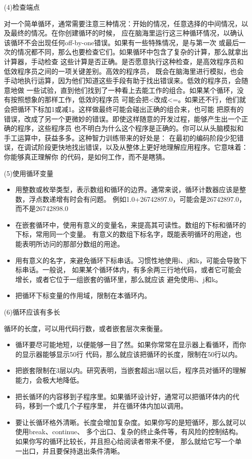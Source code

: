 \documentclass{article}
\begin{document}
\par
(4)检查端点
\par
对一个简单循环，通常需要注意三种情况：开始的情况，任意选择的中间情况，以及最终的情况。在你创建循环的时候，
应在脑海里运行这三种循环情况，以确认该循环不会出现任何off-by-one错误。如果有一些特殊情况，是与第一次
或最后一次的情况都不同，那么也要检查它们。如果循环中包含了复杂的计算，那么就拿出计算器，手动检查
这些计算是否正确。是否愿意执行这种检查，是高效程序员和低效程序员之间的一项关键差别。高效的程序员，
既会在脑海里进行模拟，也会手动地执行运算，因为他们知道这些手段有助于找出错误来。低效的程序员，会随意地做
一些试验，直到他们找到了一种看上去能工作的组合。如果某个循环，没有按照想象的那样工作，低效的程序员
可能会把<改成<=。如果还不行，他们就会把循环下标加1或减1。这样做最终可能会碰出正确的组合来，也可能
把原有的错误，改成了另一个更微妙的错误。即使这样随意的开发过程，能够产生出一个正确的程序，这些程序员
也不明白为什么这个程序是正确的。你可以从头脑模拟和手工运算中，获益多多。这种智力训练带来的好处是：
在最初的编码阶段少犯错误，在调试阶段更快地找出错误，以及从整体上更好地理解应用程序。它意味着：你能够真正理解你
的代码，是如何工作，而不是瞎猜。

\par
(5)使用循环变量
\par
\begin{itemize}
    \item 用整数或枚举类型，表示数组和循环的边界。通常来说，循环计数器应该是整数，浮点数递增有时会有问题。
    例如1.0+26742897.0，可能会是26742897.0，而不是26742898.0
    \item 在嵌套循环中，使用有意义的变量名，来提高其可读性。数组的下标和循环的下标，常用同一个变量。
    有意义的数组下标名字，既能表明循环的用途，也能表明所访问的那部分数组的用途。
    \item 用有意义的名字，来避免循环下标串话。习惯性地使用i、j和k，可能会导致下标串话。一般说，
    如果某个循环体内，有多余两三行地代码，或者它可能会增长，或者它位于一组嵌套的循环里，那么就应该
    避免使用i、j和k。
    \item 把循环下标变量的作用域，限制在本循环内。
\end{itemize}

\par
(6)循环应该有多长
\par
循环的长度，可以用代码行数，或者嵌套层次来衡量。
\begin{itemize}
    \item 循环要尽可能地短，以便能够一目了然。如果你常常在显示器上看循环，而你的显示器能够显示50行
    代码，那么就应该把循环的长度，限制在50行以内。
    \item 把嵌套限制在3层以内。研究表明，当嵌套超出3层以后，程序员对循环的理解能力，会极大地降低。
    \item 把长循环的内容移到子程序里。如果循环设计好，通常可以把循环体内的代码，移到一个或几个子程序里，
    并在循环体内加以调用。
    \item 要让长循环格外清晰。长度会增加复杂度。如果你写的是短循环，那么就可以使用break、continue、
    多个出口、复杂的终止条件等，有风险的控制结构。如果你写的循环比较长，并且担心给阅读者带来不便，
    那么就给它写一个单一出口，并且要保持退出条件清晰。
\end{itemize}
\end{document}
